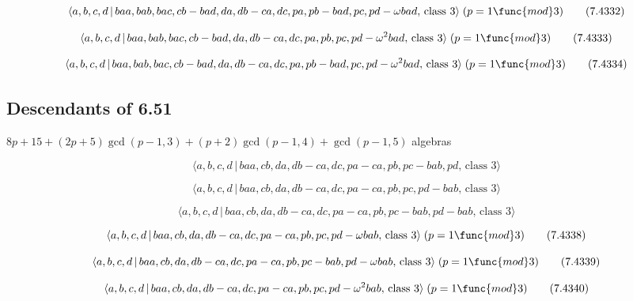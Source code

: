 \documentclass[10pt]{article}
\begin{document}
\begin{equation}
\langle a,b,c,d\,|\,baa,bab,bac,cb-bad,da,db-ca,dc,pa,pb-bad,pc,pd-\omega
bad,\,\text{class }3\rangle \;(p=1\func{mod}3)  \tag{7.4332}
\end{equation}

\begin{equation}
\langle a,b,c,d\,|\,baa,bab,bac,cb-bad,da,db-ca,dc,pa,pb,pc,pd-\omega
^{2}bad,\,\text{class }3\rangle \;(p=1\func{mod}3)  \tag{7.4333}
\end{equation}

\begin{equation}
\langle a,b,c,d\,|\,baa,bab,bac,cb-bad,da,db-ca,dc,pa,pb-bad,pc,pd-\omega
^{2}bad,\,\text{class }3\rangle \;(p=1\func{mod}3)  \tag{7.4334}
\end{equation}

\subsection{Descendants of 6.51}

$8p+15+(2p+5)\gcd (p-1,3)+(p+2)\gcd (p-1,4)+\gcd (p-1,5)$ algebras

\begin{equation}
\langle a,b,c,d\,|\,baa,cb,da,db-ca,dc,pa-ca,pb,pc-bab,pd,\,\text{class }%
3\rangle  \tag{7.4335}
\end{equation}

\begin{equation}
\langle a,b,c,d\,|\,baa,cb,da,db-ca,dc,pa-ca,pb,pc,pd-bab,\,\text{class }%
3\rangle  \tag{7.4336}
\end{equation}

\begin{equation}
\langle a,b,c,d\,|\,baa,cb,da,db-ca,dc,pa-ca,pb,pc-bab,pd-bab,\,\text{class }%
3\rangle  \tag{7.4337}
\end{equation}

\begin{equation}
\langle a,b,c,d\,|\,baa,cb,da,db-ca,dc,pa-ca,pb,pc,pd-\omega bab,\,\text{%
class }3\rangle \;(p=1\func{mod}3)  \tag{7.4338}
\end{equation}

\begin{equation}
\langle a,b,c,d\,|\,baa,cb,da,db-ca,dc,pa-ca,pb,pc-bab,pd-\omega bab,\,\text{%
class }3\rangle \;(p=1\func{mod}3)  \tag{7.4339}
\end{equation}

\begin{equation}
\langle a,b,c,d\,|\,baa,cb,da,db-ca,dc,pa-ca,pb,pc,pd-\omega ^{2}bab,\,\text{%
class }3\rangle \;(p=1\func{mod}3)  \tag{7.4340}
\end{equation}
\end{document}
